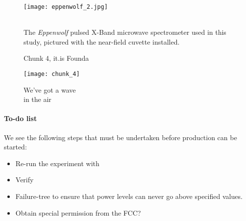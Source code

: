 \documentclass[fleqn,10pt]{article}
\begin{document}

	
%




\clearpage

\begin{figure}[H]
	\captionsetup{singlelinecheck = false, justification=justified}
	\centering
	\texttt{[image: eppenwolf\_2.jpg]}
	\caption{\\ The {\it Eppenwolf} pulsed X-Band microwave spectrometer used in this study, pictured with the near-field cuvette installed.}
	
\end{figure}





\begin{figure}[H]
	\caption{Chunk 4, it.is Founda}
\end{figure}


\clearpage

\begin{figure}[H]
	\captionsetup{singlelinecheck = false, justification=justified}
	\centering
	\texttt{[image: chunk\_4]}
	\caption{
		We've got a wave\\
		in the air}
\end{figure}






\paragraph{To-do list}

We see the following steps that must be undertaken before production can be started:

\begin{itemize}
  \item Re-run the experiment with 
  \item Verify 
  \item Failure-tree to ensure that power levels can never go above specified values.
  \item Obtain special permission from the FCC?
\end{itemize}
\end{document}
